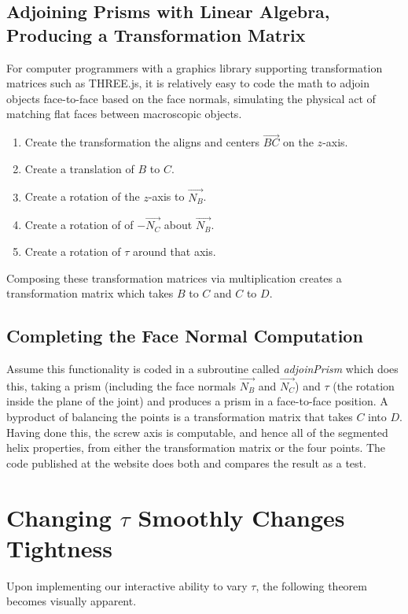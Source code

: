 \documentclass{svproc}
\begin{document}
\subsection{Adjoining Prisms with Linear Algebra, Producing a Transformation Matrix}
\label{sec:adjoin}

For computer programmers with a graphics library supporting transformation matrices such
as THREE.js\cite{dirksen2013learning},
it is relatively easy to code the math to adjoin objects
face-to-face based on the face normals, simulating the physical act of
matching flat faces between macroscopic objects.
\begin{enumerate}
  \item Create the transformation the aligns and centers $\overrightarrow{BC}$ on the $z$-axis.
\item Create a translation of $B$ to $C$.
\item Create a rotation of the $z$-axis to  $\overrightarrow{N_B}$.
\item Create a rotation of of $-\overrightarrow{N_C}$ about $\overrightarrow{N_B}$.
  \item Create a rotation of $\tau$ around that axis.
\end{enumerate}
Composing these transformation matrices via multiplication creates a
transformation matrix which takes $B$ to $C$ and $C$ to $D$.

\subsection{Completing the Face Normal Computation}
Assume this functionality
is coded in a subroutine called {\em adjoinPrism} which does this, taking a prism
(including the face normals $\overrightarrow{N_B}$ and $\overrightarrow{N_C}$) and $\tau$
(the rotation inside the plane of the joint) and produces a prism
in a face-to-face position. A byproduct
of balancing the points is a transformation matrix
that takes $C$ into $D$. Having done this, the screw axis is computable,
and hence all of the segmented helix properties,
from either the transformation matrix or the four points.
The code published at the website does both and compares the result as a test.

\section{Changing $\tau$ Smoothly Changes Tightness}

Upon implementing our interactive ability to vary $\tau$, the following
theorem becomes visually apparent.
\end{document}
